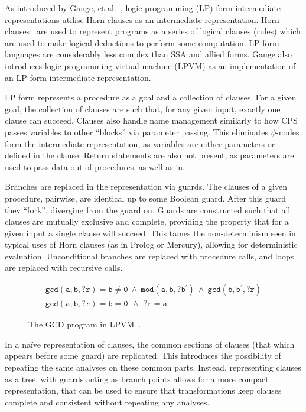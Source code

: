 As introduced by Gange, et al.~\cite{gange2015horn}, logic programming (LP) form intermediate representations utilise Horn clauses as an intermediate representation. Horn clauses~\cite{horn1951sentences} are used to represent programs as a series of logical clauses (rules) which are used to make logical deductions to perform some computation. LP form languages are considerably less complex than SSA and allied forms. Gange also introduces logic programming virtual machine (LPVM) as an implementation of an LP form intermediate representation.

LP form represents a procedure as a goal and a collection of clauses. For a given goal, the collection of clauses are such that, for any given input, exactly one clause can succeed. Clauses also handle name management similarly to how CPS passes variables to other ``blocks'' via parameter passing. This eliminates $\phi$-nodes form the intermediate representation, as variables are either parameters or defined in the clause. Return statements are also not present, as parameters are used to pass data out of procedures, as well as in. 

Branches are replaced in the representation via guards. The clauses of a given procedure, pairwise, are identical up to some Boolean guard. After this guard they ``fork'', diverging from the guard on. Guards are constructed such that all clauses are mutually exclusive and complete, providing the property that for a given input a single clause will succeed. This tames the non-determinism seen in typical uses of Horn clauses (as in Prolog or Mercury), allowing for deterministic evaluation. Unconditional branches are replaced with procedure calls, and loops are replaced with recursive calls.

\begin{figure}[ht]
  \begin{equation*}
		\begin{array}{l}
      \mathtt{gcd(a, b, ?r) = b \neq 0\ \land\ mod(a, b, ?b^\prime)\ \land\ gcd(b, b^\prime, ?r)} \\
      \mathtt{gcd(a, b, ?r) = b = 0\,\ \land\,\ ?r = a}
    \end{array}
  \end{equation*}
  \caption{The GCD program in LPVM~\cite{gange2015horn}.}
  \label{fig:gcd-lpvm}
\end{figure}

In a na\"ive representation of clauses, the common sections of clauses (that which appears before some guard) are replicated. This introduces the possibility of repeating the same analyses on these common parts. Instead, representing clauses as a tree, with guards acting as branch points allows for a more compact representation, that can be used to ensure that transformations keep clauses complete and consistent without repeating any analyses.

